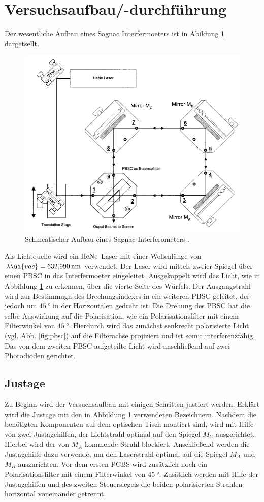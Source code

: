 \section{Versuchsaufbau/-durchführung}
Der wesentliche Aufbau eines Sagnac Interfermoeters ist in Abildung \ref{fig:sagnac_interferometer}
dargetsellt.
\begin{figure}
\centering
\includegraphics[width=0.7\linewidth]{./content/images/aufbau.png}
\caption{Schmeatischer Aufbau eines Sagnac Interferometers \cite{anleitung64}.}
\label{fig:sagnac_interferometer}
\end{figure}
Als Lichtquelle wird ein $\ce{HeNe}$ Laser mit einer Wellenlänge von
$\lambda\ua{vac}=\SI{632.990}{\nano\meter}$ verwendet. Der Laser wird mittels zweier Spiegel
über einen PBSC in das Interfermoeter eingeleitet. Ausgekoppelt wird das Licht, wie
in Abbildung \ref{fig:sagnac_interferometer} zu erkennen, über die vierte Seite
des Würfels.
Der Ausgangstrahl wird zur Bestimmugn des Brechungsindexes in ein weiteren
PBSC geleitet, der jedoch um $\SI{45}{\degree}$ in der Horizontalen gedreht ist.
Die Drehung des PBSC hat die selbe Auswirkung auf die Polarisation, wie ein Polarisationsfilter mit
einem Filterwinkel von $\SI{45}{\degree}$. Hierdurch wird das zunächst senkrecht
polarisierte Licht (vgl. Abb. \ref{fig:pbsc}) auf die Filterachse projiziert und
ist somit interferenzfähig. Das von dem zweiten PBSC aufgeteilte Licht wird
anschließend auf zwei Photodioden gerichtet.

\subsection{Justage}
Zu Beginn wird der Versuchsaufbau mit einigen Schritten justiert werden.
Erklärt wird die Justage mit den in Abbildung \ref{fig:sagnac_interferometer} verwendeten Bezeichnern.
Nachdem die benötigten Komponenten auf dem optischen Tisch montiert sind,
wird mit Hilfe von zwei Justagehilfen, der Lichtstrahl optimal auf den Spiegel $M_C$
ausgerichtet. Hierbei wird der von $M_A$ kommende Strahl blockiert.
Anschließend werden die Justagehilfe dazu verwende, um den Laserstrahl optimal auf
die Spiegel $M_A$ und $M_B$ auszurichten. Vor dem ersten PCBS wird zusätzlich noch ein Polarisationsfilter
mit einem Filterwinkel von $\SI{45}{\degree}$. Zusätlich werden mit Hilfe der Justagehilfen
und des zweiten Steuersiegels die beiden polarisierten Strahlen horizontal voneinander
getrennt.

